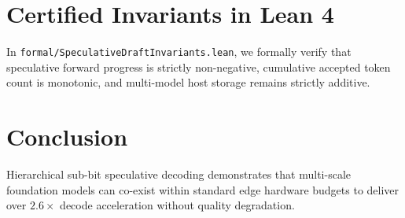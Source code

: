 \documentclass[10pt,twocolumn,letterpaper]{article}
\begin{document}
\section{Certified Invariants in Lean 4}
In \texttt{formal/SpeculativeDraftInvariants.lean}, we formally verify that speculative forward progress is strictly non-negative, cumulative accepted token count is monotonic, and multi-model host storage remains strictly additive.

\section{Conclusion}
Hierarchical sub-bit speculative decoding demonstrates that multi-scale foundation models can co-exist within standard edge hardware budgets to deliver over $2.6\times$ decode acceleration without quality degradation.
\end{document}
